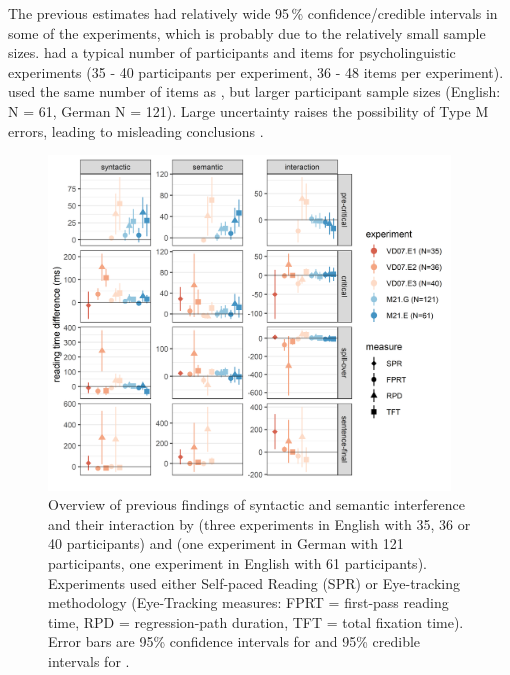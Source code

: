 \documentclass[a4paper, man, floatsintext]{apa7}
\begin{document}
The previous estimates had relatively wide 95\,\% confidence/credible intervals in some of the experiments, which is probably due to the relatively small sample sizes. \citet{vandyke07} had a typical number of participants and items for psycholinguistic experiments (35 - 40 participants per experiment, 36 - 48 items per experiment). \citet{mertzen} used the same number of items as \citet{vandyke07}, but larger participant sample sizes (English: N = 61, German N = 121). Large uncertainty raises the possibility of Type M errors, leading to misleading conclusions \citep{gelman_carlin}.  

\begin{figure}[H]
    \caption{Overview of previous findings of syntactic and semantic interference and their interaction by \citet{vandyke07} (three experiments in English with 35, 36 or 40 participants) and \citet{mertzen} (one experiment in German with 121 participants, one experiment in English with 61 participants). Experiments used either Self-paced Reading (SPR) or Eye-tracking methodology (Eye-Tracking measures: FPRT = first-pass reading time, RPD = regression-path duration, TFT = total fixation time). Error bars are 95\% confidence intervals for \citet{vandyke07} and 95\% credible intervals for \citet{mertzen}. }
    \label{fig:previous}
    \centering
    \includegraphics[width=0.95\textwidth]{images/previous_findings_allregions_long.png}
\end{figure}
\end{document}
